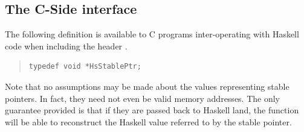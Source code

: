 \subsection{The C-Side interface}
The following definition is available to C programs inter-operating
 with Haskell code when including the header .\par
\begin{quote}
{\haddockverb\begin{verbatim}
typedef void *HsStablePtr;
\end{verbatim}}
\end{quote}
Note that no assumptions may be made about the values representing stable
  pointers. In fact, they need not even be valid memory addresses. The
 only guarantee provided is that if they are passed back to Haskell land,
 the function  will be able to reconstruct the Haskell
 value referred to by the stable pointer.\par